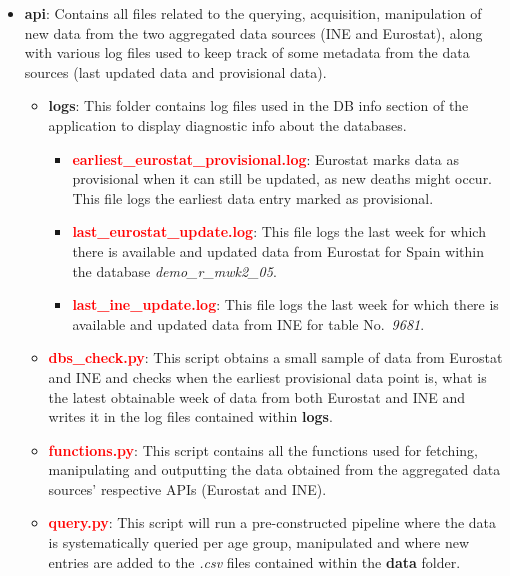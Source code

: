 \documentclass[
  a4paper]{article}
\providecommand{\tightlist}{%
  \setlength{\itemsep}{0pt}\setlength{\parskip}{0pt}}
\begin{document}
\begin{itemize}
\tightlist
\item
  \textcolor{darkspringgreen}{\textbf{api}}: Contains all files related
  to the querying, acquisition, manipulation of new data from the two
  aggregated data sources (INE and Eurostat), along with various log
  files used to keep track of some metadata from the data sources (last
  updated data and provisional data).

  \begin{itemize}
  \tightlist
  \item
    \textcolor{darkspringgreen}{\textbf{logs}}: This folder contains log
    files used in the DB info section of the application to display
    diagnostic info about the databases.

    \begin{itemize}
    \tightlist
    \item
      \textcolor{red}{\textbf{earliest\_eurostat\_provisional.log}}:
      Eurostat marks data as provisional when it can still be updated,
      as new deaths might occur. This file logs the earliest data entry
      marked as provisional.
    \item
      \textcolor{red}{\textbf{last\_eurostat\_update.log}}: This file
      logs the last week for which there is available and updated data
      from Eurostat for Spain within the database
      \emph{demo\_r\_mwk2\_05}.\\
    \item
      \textcolor{red}{\textbf{last\_ine\_update.log}}: This file logs
      the last week for which there is available and updated data from
      INE for table No.~\emph{9681}.
    \end{itemize}
  \item
    \textcolor{red}{\textbf{dbs\_check.py}}: This script obtains a small
    sample of data from Eurostat and INE and checks when the earliest
    provisional data point is, what is the latest obtainable week of
    data from both Eurostat and INE and writes it in the log files
    contained within \textcolor{darkspringgreen}{\textbf{logs}}.
  \item
    \textcolor{red}{\textbf{functions.py}}: This script contains all the
    functions used for fetching, manipulating and outputting the data
    obtained from the aggregated data sources' respective APIs (Eurostat
    and INE).
  \item
    \textcolor{red}{\textbf{query.py}}: This script will run a
    pre-constructed pipeline where the data is systematically queried
    per age group, manipulated and where new entries are added to the
    \emph{.csv} files contained within the
    \textcolor{darkspringgreen}{\textbf{data}} folder.
  \end{itemize}
\end{itemize}
\end{document}
